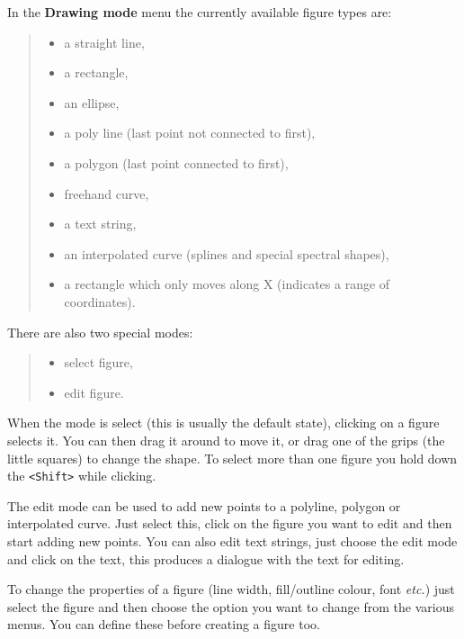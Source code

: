 \documentclass[twoside,11pt]{article}
\newcommand{\htmladdimg}[1]{}
\newcommand{\latexhtml}[2]{#1}
\renewcommand{\_}{\texttt{\symbol{95}}}
\newcommand{\inline}[1]
        {\latexhtml{\texttt{[image: sun243\_figures/\#1]}}
        {\htmladdimg[align=center]{#1.gif}}}
\newcommand{\menuitem}[1]{\textbf{#1}}
\newcommand{\hitext}[1]{\texttt{#1}}
\newcommand{\etc}{\textit{etc.}}
\begin{document}
In the \menuitem{Drawing mode} menu the currently available figure types are:
\begin{quote}
\begin{itemize}
  \item[\inline{line}] a straight line,
  \item[\inline{rectangle}] a rectangle,
  \item[\inline{ellipse}] an ellipse,
  \item[\inline{polyline}] a poly line (last point not connected to first),
  \item[\inline{polygon}] a polygon (last point connected to first),
  \item[\inline{freehand}] freehand curve,
  \item[\inline{text}] a text string,
  \item[\inline{curve}] an interpolated curve (splines and special spectral
                        shapes),
  \item[\inline{xrange}] a rectangle which only moves along X (indicates a
                         range of coordinates).
\end{itemize}
\end{quote}

There are also two special modes:
\begin{quote}
\begin{itemize}
  \item[\inline{select}] select figure,
  \item[\inline{edit}] edit figure.
\end{itemize}
\end{quote}
When the mode is select (this is usually the default state), clicking on a
figure selects it. You can then drag it around to move it, or drag one of the
grips (the little squares) to change the shape. To select more than one figure
you hold down the \hitext{<Shift>} while clicking.

The edit mode can be used to add new points to a polyline, polygon or
interpolated curve. Just select this, click on the figure you want to edit and
then start adding new points. You can also edit text strings, just choose the
edit mode and click on the text, this produces a dialogue with the text for
editing.

To change the properties of a figure (line width, fill/outline colour, font
\etc) just select the figure and then choose the option you want to change
from the various menus. You can define these before creating a figure too.
\end{document}
